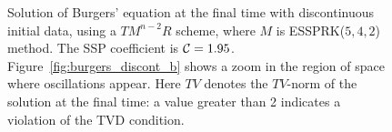 \begin{figure}
    \centering
    \;
    \caption{Solution of Burgers' equation at the final time with discontinuous initial data, using a
    $TM^{n-2}R$ scheme, where $M$ is ESSPRK($5,4,2$) method. 
    The SSP coefficient is $ \mathcal{C} = 1.95$.
    Figure~\ref{fig:burgers_discont_b} shows a zoom in the region of space where
    oscillations appear.
    Here $TV$ denotes the $TV$-norm of the solution at the final time:
    a value greater than 2 indicates a violation of the TVD condition.
    }
    \label{fig:burgers_discont}
\end{figure}

